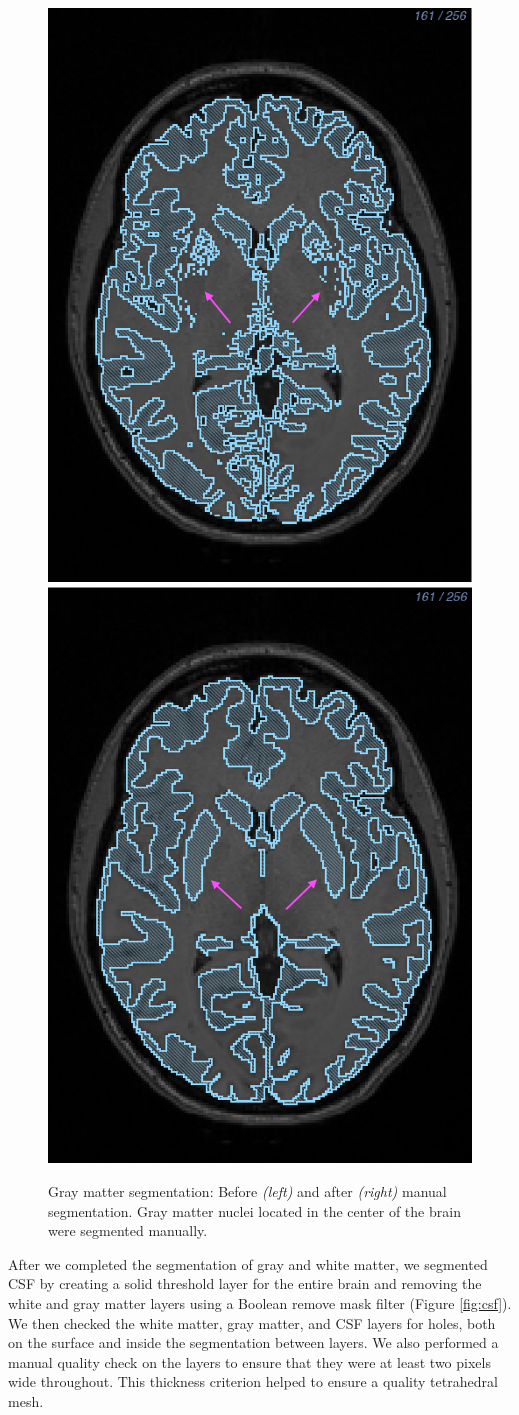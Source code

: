\begin{figure}[H]
\begin{center}
\includegraphics[width=.49\textwidth]{Figures/greymatter_before_nuclei}
\includegraphics[width=.49\textwidth]{Figures/greymatter_added_nuclei}
\caption{Gray matter segmentation: Before \textit{(left)} and after \textit{(right)} manual segmentation. Gray matter nuclei located in the center of the brain were segmented manually.}
\label{fig:gm}
\end{center}
\end{figure}

After we completed the segmentation of gray and white matter, we segmented CSF by creating a solid threshold layer for the entire brain and removing the white and gray matter layers using a Boolean remove mask filter (Figure \ref{fig:csf}). We then checked the white matter, gray matter, and CSF layers for holes, both on the surface and inside the segmentation between layers. We also performed a manual quality check on the layers to ensure that they were at least two pixels wide throughout. This thickness criterion helped to ensure a quality tetrahedral mesh.

